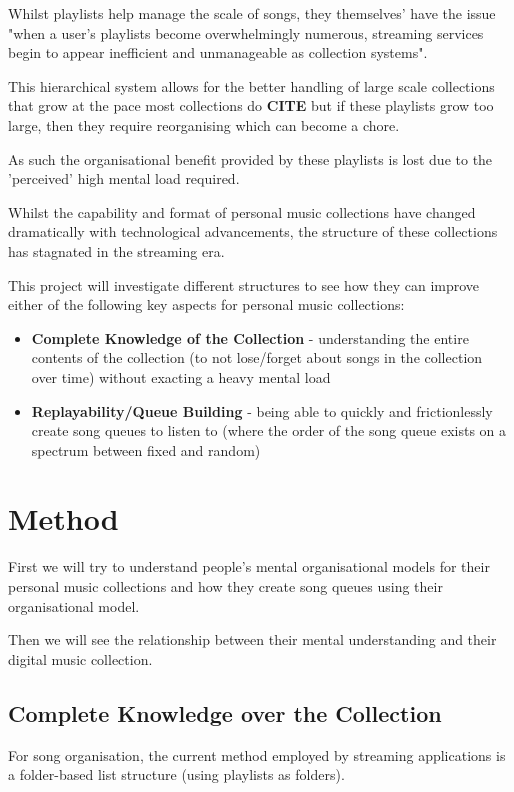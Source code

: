 Whilst playlists help manage the scale of songs, they themselves' have the issue "when a user’s playlists become overwhelmingly numerous, streaming services begin to appear inefficient and unmanageable as collection systems"\cite{playlistExperience}.

This hierarchical system allows for the better handling of large scale collections that grow at the pace most collections do \textbf{CITE} but if these playlists grow too large, then they require reorganising which can become a chore.

As such the organisational benefit provided by these playlists is lost due to the 'perceived' high mental load required.

Whilst the capability and format of personal music collections have changed dramatically with technological advancements, the structure of these collections has stagnated in the streaming era.

This project will investigate different structures to see how they can improve either of the following key aspects for personal music collections:\begin{itemize}
    \item \textbf{
        Complete Knowledge of the Collection
    } - understanding the entire contents of the collection (to not lose/forget about songs in the collection over time) without exacting a heavy mental load
    \item \textbf{
        Replayability/Queue Building
    } - being able to quickly and frictionlessly create song queues to listen to (where the order of the song queue exists on a spectrum between fixed and random)
\end{itemize}

\section{Method}
First we will try to understand people's mental organisational models for their personal music collections and how they create song queues using their organisational model.

Then we will see the relationship between their mental understanding and their digital music collection.

\subsection{Complete Knowledge over the Collection}
For song organisation, the current method employed by streaming applications is a folder-based list structure (using playlists as folders).

